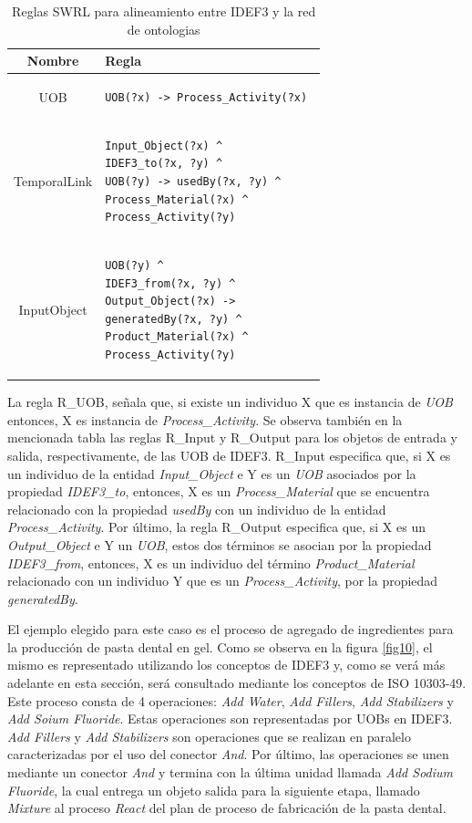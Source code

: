 \documentclass[journal]{IEEEtran}
\begin{document}
\begin{table}[!t]
\renewcommand{\arraystretch}{1.3}
\caption{Reglas SWRL para alineamiento entre IDEF3 y la red de ontologias}
\label{tabla8}
\centering
\begin{tabular}{|c|p{6cm}|}
\hline
 Nombre &  Regla \\ \hline
UOB          & \begin{verbatim}UOB(?x) -> Process_Activity(?x) \end{verbatim} \\ \cline{1-2}
TemporalLink & \begin{verbatim}Input_Object(?x) ^ 
IDEF3_to(?x, ?y) ^ 
UOB(?y) -> usedBy(?x, ?y) ^ 
Process_Material(?x) ^ 
Process_Activity(?y) \end{verbatim} \\ \cline{1-2}
InputObject  & \begin{verbatim}UOB(?y) ^ 
IDEF3_from(?x, ?y) ^ 
Output_Object(?x) -> 
generatedBy(?x, ?y) ^  
Product_Material(?x) ^ 
Process_Activity(?y) \end{verbatim} \\ \hline   
\end{tabular}
\end{table}

La regla R\_UOB, señala que, si existe un individuo X que es instancia de \emph{UOB} entonces, X es instancia de \emph{Process\_Activity}. Se observa tambi\'en en la mencionada tabla las reglas R\_Input y R\_Output para los objetos de entrada y salida, respectivamente, de las UOB de IDEF3. R\_Input especifica que, si X es un individuo de la entidad \emph{Input\_Object} e Y es un \emph{UOB} asociados por la propiedad \emph{IDEF3\_to}, entonces, X es un \emph{Process\_Material} que se encuentra relacionado con la propiedad \emph{usedBy} con un individuo de la entidad \emph{Process\_Activity}. Por \'ultimo, la regla R\_Output especifica que, si X es un \emph{Output\_Object} e Y un \emph{UOB}, estos dos t\'erminos se asocian por la propiedad \emph{IDEF3\_from}, entonces, X es un individuo del t\'ermino \emph{Product\_Material} relacionado con un individuo Y que es un \emph{Process\_Activity}, por la propiedad \emph{generatedBy}.

El ejemplo elegido para este caso es el proceso de agregado de ingredientes para la producci\'on de pasta dental en gel. Como se observa en la figura \ref{fig10}, el mismo es representado utilizando los conceptos de IDEF3 y, como se ver\'a m\'as adelante en esta secci\'on, ser\'a consultado mediante los conceptos de ISO 10303-49. Este proceso consta de 4 operaciones: \emph{Add Water}, \emph{Add Fillers}, \emph{Add Stabilizers} y \emph{Add Soium Fluoride}. Estas operaciones son representadas por UOBs en IDEF3. \emph{Add Fillers} y \emph{Add Stabilizers} son operaciones que se realizan en paralelo caracterizadas por el uso del conector \emph{And}. Por \'ultimo, las operaciones se unen mediante un conector \emph{And} y termina con la \'ultima unidad llamada \emph{Add Sodium Fluoride}, la cual entrega un objeto salida para la siguiente etapa, llamado \emph{Mixture} al proceso \emph{React} del plan de proceso de fabricaci\'on de la pasta dental.
\end{document}
